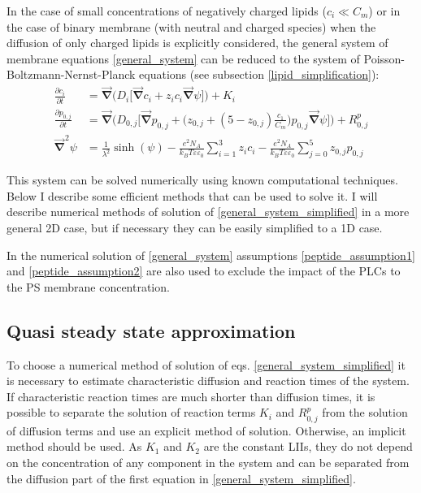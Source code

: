 In the case of small concentrations of negatively charged lipids ($c_i\ll C_m$) or in the case of binary membrane (with neutral and charged species) when the diffusion of only charged lipids is explicitly considered, the general system of membrane equations \eqref{general_system} can be reduced to the system of Poisson-Boltzmann-Nernst-Planck equations (see subsection \ref{lipid_simplification}):
\begin{align}
\label{general_system_simplified}
\frac{\partial c_i}{\partial t}&=\vec{\mathbf{\nabla}} \Big(D_i\Big[\vec{\mathbf{\nabla}} c_i + z_i c_i \vec{\mathbf{\nabla}}\psi \Big]\Big) + K_{i} \nonumber \\
\frac{\partial p_{0,j}}{\partial t}&=\vec{\mathbf{\nabla}} \Big(D_{0,j}\Big[\vec{\mathbf{\nabla}} p_{0,j} + \Big(z_{0,j} + (5 - z_{0,j})\frac{c_1}{C_m}\Big) p_{0,j} \vec{\mathbf{\nabla}}\psi\Big]\Big) + R_{0,j}^p \nonumber \\
\vec{\mathbf{\nabla}}^2 \psi&=\frac{1}{\lambda^2}\sinh(\psi) - \frac{e^2 N_A}{k_B T\varepsilon\varepsilon_0} \sum_{i=1}^3 z_i c_i - \frac{e^2 N_A}{k_B T\varepsilon\varepsilon_0} \sum_{j=0}^5 z_{0,j} p_{0,j}
\end{align}

This system can be solved numerically using known computational techniques. Below I describe some efficient methods that can be used to solve it. I will describe numerical methods of solution of \eqref{general_system_simplified} in a more general 2D case, but if necessary they can be easily simplified to a 1D case.

In the numerical solution of \eqref{general_system} assumptions \eqref{peptide_assumption1} and \eqref{peptide_assumption2} are also used to exclude the impact of the PLCs to the PS membrane concentration.

\subsection{Quasi steady state approximation}

\label{quasi_steady_state}

To choose a numerical method of solution of eqs. \eqref{general_system_simplified} it is necessary to estimate characteristic diffusion and reaction times of the system. If characteristic reaction times are much shorter than diffusion times, it is possible to separate the solution of reaction terms $K_{i}$ and $R_{0,j}^p$ from the solution of diffusion terms and use an explicit method of solution. Otherwise, an implicit method should be used. As $K_1$ and $K_2$ are the constant LIIs, they do not depend on the concentration of any component in the system and can be separated from the diffusion part of the first equation in \eqref{general_system_simplified}.

